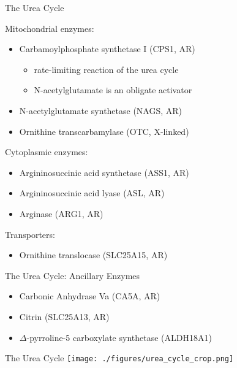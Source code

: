 \documentclass[presentation, smaller]{beamer}
\begin{document}
\begin{frame}[label={sec:orgheadline2}]{The Urea Cycle}
\begin{block}{Mitochondrial enzymes:}
\begin{itemize}
\item Carbamoylphosphate synthetase I (CPS1, AR)
\begin{itemize}
\item rate-limiting reaction of the urea cycle
\item N-acetylglutamate is an obligate activator
\end{itemize}
\item N-acetylglutamate synthetase (NAGS, AR)
\item Ornithine transcarbamylase (OTC, X-linked)
\end{itemize}
\end{block}
\begin{block}{Cytoplasmic enzymes:}
\begin{itemize}
\item Argininosuccinic acid synthetase (ASS1, AR)
\item Argininosuccinic acid lyase (ASL, AR)
\item Arginase (ARG1, AR)
\end{itemize}
\end{block}

\begin{block}{Transporters:}
\begin{itemize}
\item Ornithine translocase (SLC25A15, AR)
\end{itemize}
\end{block}
\end{frame}

\begin{frame}[label={sec:orgheadline3}]{The Urea Cycle: Ancillary Enzymes}
\begin{itemize}
\item Carbonic Anhydrase Va (CA5A, AR)
\item Citrin (SLC25A13, AR)
\item \(\Delta\)-pyrroline-5 carboxylate synthetase (ALDH18A1)
\end{itemize}
\end{frame}

\begin{frame}[label={sec:orgheadline4}]{The Urea Cycle}
\centering
\texttt{[image: ./figures/urea\_cycle\_crop.png]}
\end{frame}
\end{document}
